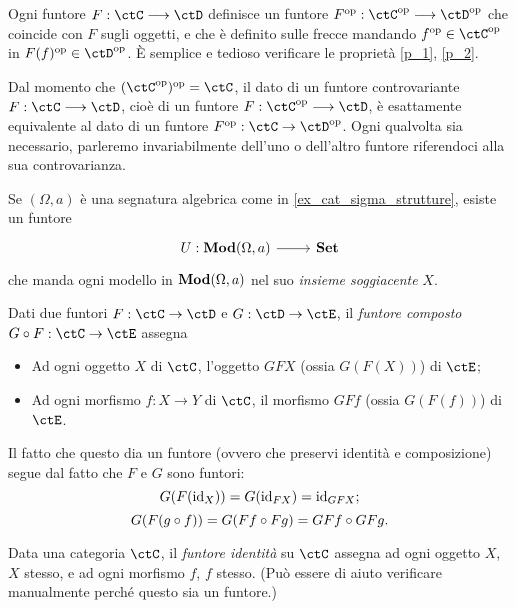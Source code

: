 \begin{remark}
\end{remark}
\begin{remark}
	Ogni funtore \(F : \ctC\fun\ctD\) definisce un funtore \(F^\op : \ctC^\op \fun\ctD^\op\) che coincide con \(F\) sugli oggetti, e che è definito sulle frecce mandando \(f^\op\in\ctC^\op\) in \(F(f)^\op\in\ctD^\op\). \`E semplice e tedioso verificare le proprietà \ref{p_1}, \ref{p_2}.

	Dal momento che \((\ctC^\op)^\op = \ctC\), il dato di un funtore controvariante \(F : \ctC\fun\ctD\), cioè di un funtore \(F : \ctC^\op \fun\ctD\), è esattamente equivalente al dato di un funtore \(F^\op : \ctC \to \ctD^\op\). Ogni qualvolta sia necessario, parleremo invariabilmente dell'uno o dell'altro funtore riferendoci alla sua controvarianza.
\end{remark}
\begin{example}\label{exa_funtori_liberi_forgetti}
	Se \((\Omega,a)\) è una segnatura algebrica come in \ref{ex_cat_sigma_strutture}, esiste un funtore
	\[
		\begin{tikzcd}
			U : \ctMod(\Omega,a) \ar[r] & \ctSet
		\end{tikzcd}
	\]
	che manda ogni modello in \(\mathbf{Mod}(\Omega,a)\) nel suo \emph{insieme soggiacente} \(X\).
\end{example}
\begin{definition}\label{compo_funtori}
	Dati due funtori \(F:\ctC\to\ctD\) e \(G:\ctD\to\ctE\), il \emph{funtore composto} \(G\cmp F:\ctC\to\ctE\) assegna
	\begin{itemize}
		\item Ad ogni oggetto \(X\) di \(\ctC\), l'oggetto \(GFX\) (ossia \(G(F(X))\)) di \(\ctE\);
		\item Ad ogni morfismo \(f:X\to Y\) di \(\ctC\), il morfismo \(GFf\) (ossia \(G(F(f))\)) di \(\ctE\).
	\end{itemize}
	Il fatto che questo dia un funtore (ovvero che preservi identità e composizione) segue dal fatto che \(F\) e \(G\) sono funtori:
	\[
		G(F(\mathrm{id}_X)) = G(\mathrm{id}_{FX}) = \mathrm{id}_{GFX} ;
	\]
	\[
		G(F(g\circ f)) = G(Ff\circ Fg) = GFf\circ GFg .
	\]
\end{definition}

\begin{definition}\label{def_funtore_id}
	Data una categoria \(\ctC\), il \emph{funtore identità} su \(\ctC\) assegna ad ogni oggetto \(X\), \(X\) stesso, e ad ogni morfismo \(f\), \(f\) stesso.
	(Può essere di aiuto verificare manualmente perché questo sia un funtore.)
\end{definition}

